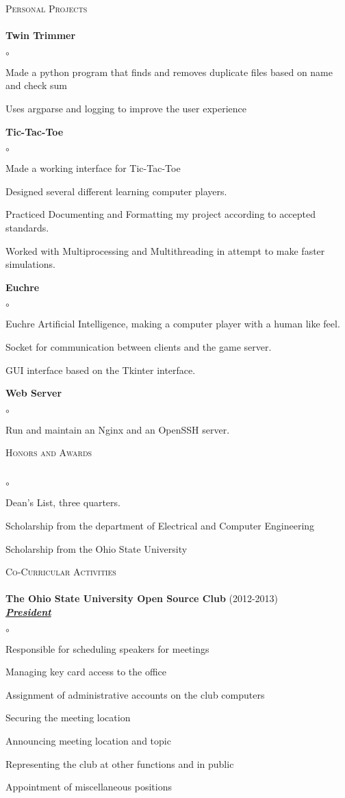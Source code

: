 \documentclass{article}
\newcommand{\lineunder}{\vspace*{-8pt} \\ \hspace*{-18pt} \hrulefill \\}
\newcommand{\header}[1]{{\hspace*{-15pt}\vspace*{6pt} \textsc{#1}} \vspace*{-6pt} \lineunder}
\newcommand{\organization}[3]{{ \textbf{#1} (#2)\\ \underline{\textbf{\emph{#3}}}\\  }}
\newcommand{\project}[1]{{ \textbf{#1}  }}
\newenvironment{achievements}{\begin{list}{$\circ$}{\topsep 0pt \itemsep -2pt}}{\vspace*{4pt}\end{list}}
\begin{document}
\header{Personal Projects}
\project{Twin Trimmer}
	\begin{achievements}
	\item Made a python program that finds and removes duplicate files based on name and check sum
	\item Uses argparse and logging to improve the user experience
	\end{achievements}
\project{Tic-Tac-Toe}
	\begin{achievements}
	\item Made a working interface for Tic-Tac-Toe
	\item Designed several different learning computer players.
	\item Practiced Documenting and Formatting my project according to
	accepted standards.
	\item Worked with Multiprocessing and  Multithreading in attempt to
	make faster simulations.
	\end{achievements}

\project{Euchre}
	\begin{achievements}
	\item Euchre Artificial Intelligence, making a computer player with
a human like feel.
	\item Socket for communication between clients and the game server.
	\item GUI interface based on the Tkinter interface.
	\end{achievements}

\project{Web Server}
	\begin{achievements}
	\item Run and maintain an Nginx and an OpenSSH server.
	\end{achievements}

\newpage

\header{Honors and Awards}
\begin{achievements}
	\item Dean's List, three quarters.
	\item Scholarship from the department of Electrical and Computer Engineering
	\item Scholarship from the Ohio State University
\end{achievements}

\header{Co-Curricular Activities}
\organization{The Ohio State University Open Source Club}{2012-2013}{President}
	\begin{achievements}
	\item Responsible for scheduling speakers for meetings
	\item Managing key card access to the office
	\item Assignment of administrative accounts on the club computers
	\item Securing the meeting location
	\item Announcing meeting location and topic
	\item Representing the club at other functions and in public
	\item Appointment of miscellaneous positions
	\end{achievements}
\end{document}
